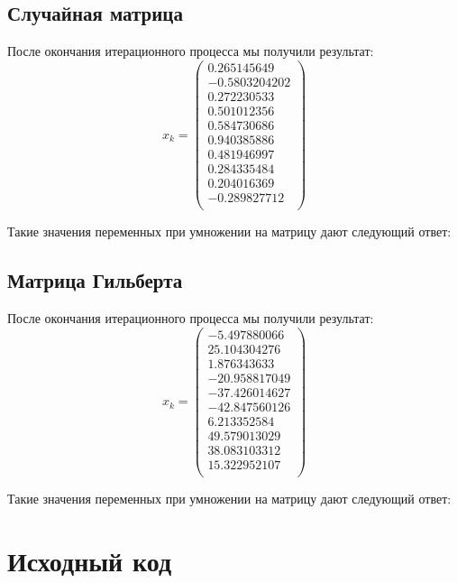 \documentclass[../../report.tex]{subfiles}
\begin{document}
\subsection{Случайная матрица}
После окончания итерационного процесса мы получили результат:
\[
x_{k} = 
\begin{pmatrix}
    0.265145649 \\
  -0.5803204202 \\
    0.272230533 \\
    0.501012356 \\
    0.584730686 \\
    0.940385886 \\
    0.481946997 \\
    0.284335484 \\
    0.204016369 \\
   -0.289827712 \\
\end{pmatrix}
\]

Такие значения переменных при умножении на матрицу дают следующий ответ:


\subsection{Матрица Гильберта}
После окончания итерационного процесса мы получили результат:
\[
x_{k} = 
\begin{pmatrix}
    -5.497880066 \\
    25.104304276 \\
     1.876343633 \\
   -20.958817049 \\
   -37.426014627 \\
   -42.847560126 \\
     6.213352584 \\
    49.579013029 \\
    38.083103312 \\
    15.322952107 \\
\end{pmatrix}
\]

Такие значения переменных при умножении на матрицу дают следующий ответ:


\section{Исходный код}
\end{document}
